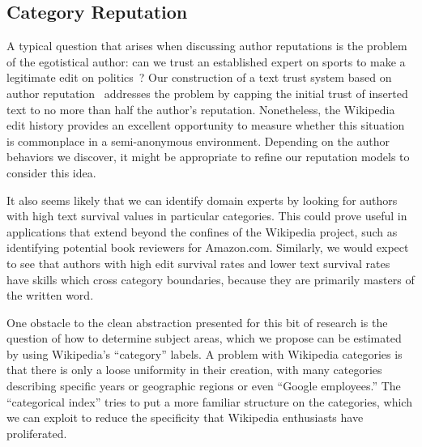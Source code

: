 \subsection{Category Reputation}

A typical question that arises when discussing
author reputations is the problem of the egotistical
author: can we trust an established expert on sports to make
a legitimate edit on politics~\cite{Erroneous2007}?
Our construction of a text trust system based
on author reputation~\cite{WikiTrust2008}
addresses the problem by capping the
initial trust of inserted text to no more than half
the author's reputation.
Nonetheless, the Wikipedia edit history provides an
excellent opportunity to measure whether this situation
is commonplace in a semi-anonymous environment.
Depending on the author behaviors we discover,
it might be appropriate to refine our reputation
models to consider this idea.

It also seems likely that
we can identify domain experts by looking for authors
with high text survival values in particular categories.
This could prove useful in applications that extend
beyond the confines of the Wikipedia project,
such as identifying potential book reviewers for
Amazon.com.
Similarly, we would expect to see that authors
with high edit survival rates and lower text survival
rates have skills which cross category boundaries,
because they are primarily masters of the written word.

One obstacle to the clean abstraction presented for this
bit of research is the question of how to determine subject areas,
which we propose can be estimated by using Wikipedia's
``category'' labels.
A problem with Wikipedia categories is that there
is only a loose uniformity in their creation,
with many categories describing specific years
or geographic regions or even ``Google employees.''
The ``categorical index'' tries to put a more
familiar structure on the categories, which
we can exploit to reduce the specificity
that Wikipedia enthusiasts have proliferated.


